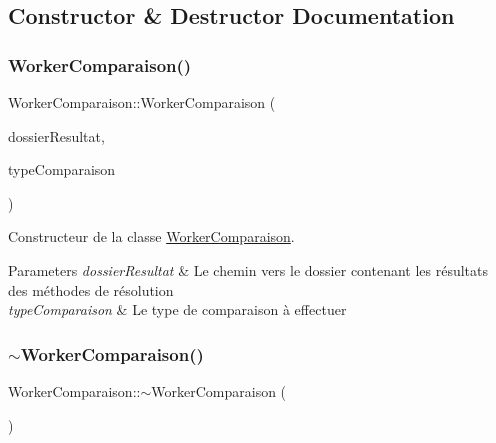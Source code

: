 \subsection{Constructor \& Destructor Documentation}
\mbox{\label{classWorkerComparaison_ab4c8a73500944f1e13c9008dd6302e80}} 
\subsubsection{\texorpdfstring{Worker\+Comparaison()}{WorkerComparaison()}}
{\footnotesize\ttfamily Worker\+Comparaison\+::\+Worker\+Comparaison (\begin{DoxyParamCaption}\item[{Q\+String}]{dossier\+Resultat,  }\item[{Q\+String}]{type\+Comparaison }\end{DoxyParamCaption})}



Constructeur de la classe \hyperlink{classWorkerComparaison}{Worker\+Comparaison}. 


\begin{DoxyParams}{Parameters}
{\em dossier\+Resultat} & Le chemin vers le dossier contenant les résultats des méthodes de résolution \\
\hline
{\em type\+Comparaison} & Le type de comparaison à effectuer \\
\hline
\end{DoxyParams}
\mbox{\label{classWorkerComparaison_a82acf722e3274431c0f86093c9dcb799}} 
\subsubsection{\texorpdfstring{$\sim$\+Worker\+Comparaison()}{~WorkerComparaison()}}
{\footnotesize\ttfamily Worker\+Comparaison\+::$\sim$\+Worker\+Comparaison (\begin{DoxyParamCaption}{ }\end{DoxyParamCaption})}




